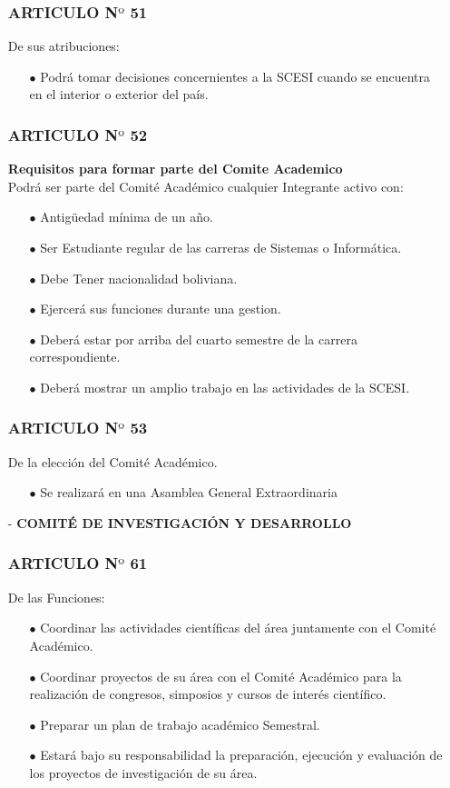 \documentclass[11pt,letterpaper]{book}
\begin{document}
\begin{itemize}
\subsubsection*{ARTICULO N$º$ 51}
De sus atribuciones:
\begin{itemize}
\item[$\bullet$] Podrá tomar decisiones concernientes a la SCESI cuando se encuentra en el interior o exterior del país. 
\end{itemize}

\subsubsection*{ARTICULO N$º$ 52}
{\bf Requisitos para formar parte del Comite Academico }\\
Podrá ser parte del Comité Académico cualquier Integrante activo con:
\begin{itemize}
\item[$\bullet$] Antigüedad mínima de un año. 
\item[$\bullet$] Ser Estudiante regular de las carreras de Sistemas o Informática.  
\item[$\bullet$] Debe Tener nacionalidad boliviana. 
\item[$\bullet$] Ejercerá sus funciones durante una gestion. 
\item[$\bullet$] Deberá estar por arriba del cuarto semestre de la carrera correspondiente. 
\item[$\bullet$] Deberá mostrar un amplio trabajo en las actividades de la SCESI. 
\end{itemize}
\subsubsection*{ARTICULO N$º$ 53}
De la elección del Comité Académico. 
\begin{itemize}
\item[$\bullet$] Se realizará en una Asamblea General Extraordinaria
\end{itemize}

\item[-] {\bf COMITÉ DE INVESTIGACIÓN Y DESARROLLO}
\subsubsection*{ARTICULO N$º$ 61}
De las Funciones:
\begin{itemize}
\item[$\bullet$] Coordinar las actividades científicas del área juntamente con el Comité Académico. 
\item[$\bullet$] Coordinar proyectos de su área con el Comité Académico para la realización de congresos, simposios y cursos de interés científico. 
\item[$\bullet$] Preparar un plan de trabajo académico Semestral. 
\item[$\bullet$] Estará bajo su responsabilidad la preparación, ejecución y evaluación de los proyectos de investigación de su área. 
\end{itemize}

\end{itemize}
\end{document}
